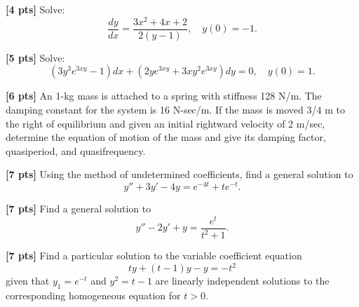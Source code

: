 \documentclass[11pt]{article}
\begin{document}
\makelabtitle


\begin{problem}
\textbf{[4 pts]} Solve:
\begin{equation*}
     \frac{dy}{dx}=\frac{3x^{2}+4x+2}{2(y-1)}, \quad y(0)=-1.
\end{equation*}
\end{problem}


\vspace{0pt}
\begin{problem}
\textbf{[5 pts]} Solve:
\begin{equation*}
     (3y^{ 3} e ^{3xy} − 1)dx + (2ye ^{3xy} + 3xy ^{2} e ^{3xy} )dy = 0, \quad y(0) = 1.
\end{equation*}
\end{problem}



\begin{problem}
\textbf{[6 pts]} An 1-kg mass is attached to a spring with stiffness 128 N/m. The damping constant for the
system is 16 N-sec/m. If the mass is moved 3/4 m to the right of equilibrium and given an
initial rightward velocity of 2 m/sec, determine the equation of motion of the mass and give
its damping factor, quasiperiod, and quasifrequency.
\end{problem}


\begin{problem}
\textbf{[7 pts]} Using the method of undetermined coefficients, find a general solution to
\begin{equation*}
y'' + 3y' − 4y = e ^{−4t} + te ^{−t}.
\end{equation*}
\end{problem}



\begin{problem}
\textbf{[7 pts]} Find a general solution to
\begin{equation*}
 y'' − 2y' + y = \frac{e^{t}}{t^{2}+1}.
\end{equation*}
\end{problem}



\begin{problem}
\textbf{[7 pts]} Find a particular solution to the variable coefficient equation
\begin{equation*}
 ty + (t − 1)y − y = −t^{ 2}
\end{equation*}
given that $y _{1} = e ^{−t}$ and $y ^{2} = t − 1$ are linearly independent solutions to the corresponding
homogeneous equation for $t > 0$.
\end{problem}
\end{document}
